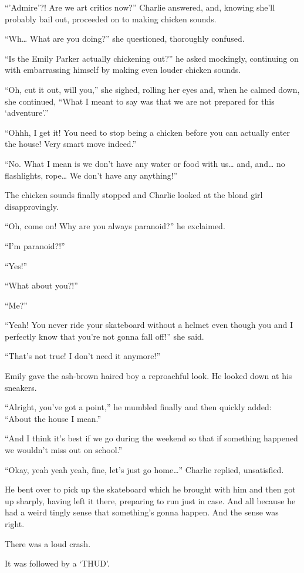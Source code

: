 “’Admire’?! Are we art critics now?” Charlie answered, and, knowing she’ll probably bail out, proceeded on to making chicken sounds.

“Wh… What are you doing?” she questioned, thoroughly confused.

“Is the Emily Parker actually chickening out?” he asked mockingly, continuing on with embarrassing himself by making even louder chicken sounds.

“Oh, cut it out, will you,” she sighed, rolling her eyes and, when he calmed down, she continued, “What I meant to say was that we are not prepared for this ‘adventure’.”

“Ohhh, I get it! You need to stop being a chicken before you can actually enter the house! Very smart move indeed.”
  
“No. What I mean is we don’t have any water or food with us… and, and… no flashlights, rope… We don’t have any anything!”

The chicken sounds finally stopped and Charlie looked at the blond girl disapprovingly.

“Oh, come on! Why are you always paranoid?” he exclaimed.

“I’m paranoid?!”

“Yes!”

“What about you?!”

“Me?”

“Yeah! You never ride your skateboard without a helmet even though you and I perfectly know that you’re not gonna fall off!” she said.

“That’s not true! I don’t need it anymore!”

Emily gave the ash-brown haired boy a reproachful look. He looked down at his sneakers.

“Alright, you’ve got a point,” he mumbled finally and then quickly added: “About the house I mean.”

“And I think it’s best if we go during the weekend so that if something happened we wouldn’t miss out on school.”

“Okay, yeah yeah yeah, fine, let’s just go home…” Charlie replied, unsatisfied.

He bent over to pick up the skateboard which he brought with him and then got up sharply, having left it there, preparing to run just in case. And all because he had a weird tingly sense that something’s gonna happen. And the sense was right.

There was a loud crash.

It was followed by a ‘THUD’.

